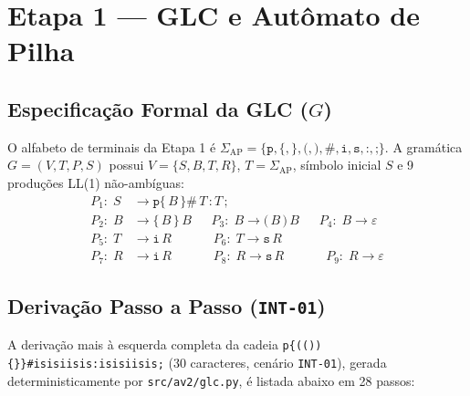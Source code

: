 \section{Etapa 1 --- GLC e Autômato de Pilha}

\subsection{Especificação Formal da GLC ($G$)}

O alfabeto de terminais da Etapa 1 é $\Sigma_{\text{AP}} = \{\texttt{p}, \texttt{\{}, \texttt{\}}, \texttt{(}, \texttt{)}, \texttt{\#}, \texttt{i}, \texttt{s}, \texttt{:}, \texttt{;}\}$. A gramática $G = (V, T, P, S)$ possui $V = \{S, B, T, R\}$, $T = \Sigma_{\text{AP}}$, símbolo inicial $S$ e 9 produções LL(1) não-ambíguas:
{\small
\begin{align*}
P_1:\; S &\to \texttt{p\{}\,B\,\texttt{\}\#}\,T\,\texttt{:}\,T\,\texttt{;} \\
P_2:\; B &\to \texttt{\{}\,B\,\texttt{\}}\,B \quad\;\; P_3:\; B \to \texttt{(}\,B\,\texttt{)}\,B \quad\;\; P_4:\; B \to \varepsilon \\
P_5:\; T &\to \texttt{i}\,R \qquad\quad\; P_6:\; T \to \texttt{s}\,R \\
P_7:\; R &\to \texttt{i}\,R \qquad\quad\; P_8:\; R \to \texttt{s}\,R \qquad\quad\; P_9:\; R \to \varepsilon
\end{align*}}

\subsection{Derivação Passo a Passo (\texttt{INT-01})}

A derivação mais à esquerda completa da cadeia \texttt{p\{(())\{\}\}\#isisiisis:isisiisis;} (30 caracteres, cenário \texttt{INT-01}), gerada deterministicamente por \texttt{src/av2/glc.py}, é listada abaixo em 28 passos:

